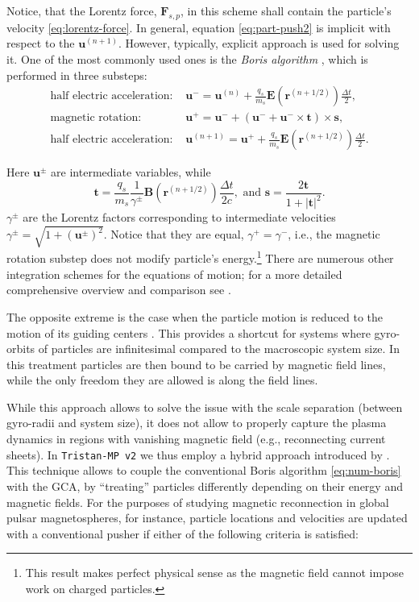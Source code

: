 \noindent Notice, that the Lorentz force, $\bm{F}_{s,p}$, in this scheme shall contain the particle's velocity \eqref{eq:lorentz-force}. In general, equation \eqref{eq:part-push2} is implicit with respect to the $\bm{u}^{(n+1)}$. However, typically, explicit approach is used for solving it. One of the most commonly used ones is the \emph{Boris algorithm} \citep{Boris1970}, which is performed in three substeps:
\begin{equation}
\label{eq:num-boris}
  \begin{aligned}
    \textrm{half electric acceleration:  }&\bm{u}^- = \bm{u}^{(n)} + \frac{q_s}{m_s}\bm{E}(\bm{r}^{(n+1/2)})\frac{\Delta t}{2}, \\
    \textrm{magnetic rotation:  }& \bm{u}^+  = \bm{u}^- + (\bm{u}^-+\bm{u}^-\times \bm{t})\times\bm{s},\\
    \textrm{half electric acceleration:  }&\bm{u}^{(n+1)} = \bm{u}^+ + \frac{q_s}{m_s}\bm{E}(\bm{r}^{(n+1/2)})\frac{\Delta t}{2}.
  \end{aligned}
\end{equation}

\noindent Here $\bm{u}^\pm$ are intermediate variables, while
\begin{equation}
  \bm{t} = \frac{q_s}{m_s}\frac{1}{\gamma^\pm }\bm{B}(\bm{r}^{(n+1/2)}) \frac{\Delta t}{2 c}, \textrm{ and } \bm{s} = \frac{2\bm{t}}{1 + |\bm{t}|^2}.
\end{equation}
\noindent $\gamma^\pm$ are the Lorentz factors corresponding to intermediate velocities $\gamma^\pm = \sqrt{1 + (\bm{u}^{\pm})^2}$. Notice that they are equal, $\gamma^+ = \gamma^-$, i.e., the magnetic rotation substep does not modify particle's energy.\footnote{This result makes perfect physical sense as the magnetic field cannot impose work on charged particles.} There are numerous other integration schemes for the equations of motion; for a more detailed comprehensive overview and comparison see \cite{2018ApJS..235...21R}.

The opposite extreme is the case when the particle motion is reduced to the motion of its guiding centers \citep[\emph{guiding center approximation}, GCA; see, e.g.,][]{1963RvGSP...1..283N}. This provides a shortcut for systems where gyro-orbits of particles are infinitesimal compared to the macroscopic system size. In this treatment particles are then bound to be carried by magnetic field lines, while the only freedom they are allowed is along the field lines. 

While this approach allows to solve the issue with the scale separation (between gyro-radii and system size), it does not allow to properly capture the plasma dynamics in regions with vanishing magnetic field (e.g., reconnecting current sheets). In \texttt{Tristan-MP v2} we thus employ a hybrid approach introduced by \cite{2020ApJS..251...10B}. This technique allows to couple the conventional Boris algorithm \eqref{eq:num-boris} with the GCA, by ``treating'' particles differently depending on their energy and magnetic fields. For the purposes of studying magnetic reconnection in global pulsar magnetospheres, for instance, particle locations and velocities are updated with a conventional pusher if either of the following criteria is satisfied:

